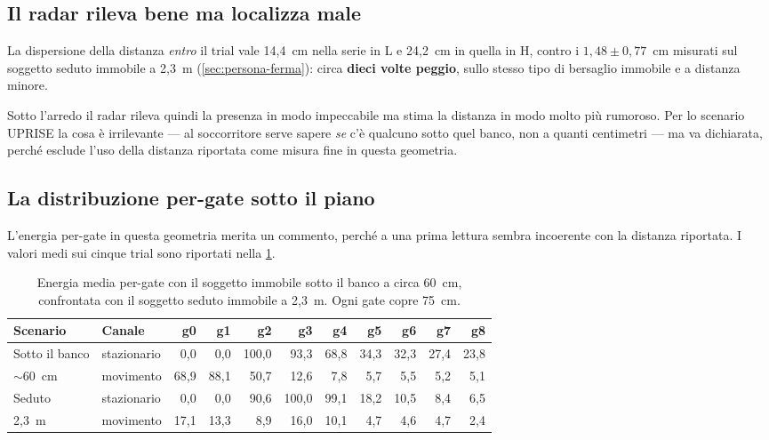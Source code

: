 \subsection{Il radar rileva bene ma localizza male}

La dispersione della distanza \emph{entro} il trial vale 14,4~cm nella serie in L e
24,2~cm in quella in H, contro i $1{,}48 \pm 0{,}77$~cm misurati sul soggetto seduto
immobile a 2,3~m (\cref{sec:persona-ferma}): circa \textbf{dieci volte peggio}, sullo
stesso tipo di bersaglio immobile e a distanza minore.

Sotto l'arredo il radar rileva quindi la presenza in modo impeccabile ma stima la
distanza in modo molto più rumoroso. Per lo scenario UPRISE la cosa è irrilevante ---
al soccorritore serve sapere \emph{se} c'è qualcuno sotto quel banco, non a quanti
centimetri --- ma va dichiarata, perché esclude l'uso della distanza riportata come
misura fine in questa geometria.

\subsection{La distribuzione per-gate sotto il piano}
\label{sec:gate-sotto-banco}

L'energia per-gate in questa geometria merita un commento, perché a una prima lettura
sembra incoerente con la distanza riportata. I valori medi sui cinque trial sono
riportati nella \cref{tab:gate-sotto-banco}.

\begin{table}[htbp]
\centering
\caption{Energia media per-gate con il soggetto immobile sotto il banco a circa
60~cm, confrontata con il soggetto seduto immobile a 2,3~m. Ogni gate copre 75~cm.}
\label{tab:gate-sotto-banco}
\small
\begin{tabular}{@{}llrrrrrrrrr@{}}
\toprule
\textbf{Scenario} & \textbf{Canale} & \textbf{g0} & \textbf{g1} & \textbf{g2} &
\textbf{g3} & \textbf{g4} & \textbf{g5} & \textbf{g6} & \textbf{g7} & \textbf{g8} \\
\midrule
Sotto il banco & stazionario & 0,0 & 0,0 & 100,0 & 93,3 & 68,8 & 34,3 & 32,3 & 27,4 & 23,8 \\
$\sim$60~cm    & movimento   & 68,9 & 88,1 & 50,7 & 12,6 & 7,8 & 5,7 & 5,5 & 5,2 & 5,1 \\
\midrule
Seduto         & stazionario & 0,0 & 0,0 & 90,6 & 100,0 & 99,1 & 18,2 & 10,5 & 8,4 & 6,5 \\
2,3~m          & movimento   & 17,1 & 13,3 & 8,9 & 16,0 & 10,1 & 4,7 & 4,6 & 4,7 & 2,4 \\
\bottomrule
\end{tabular}
\end{table}


